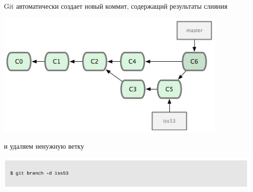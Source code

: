 \documentclass{beamer}
\begin{document}
\begin{frame}
\begin{block}{Git автоматически создает новый коммит, содержащий результаты слияния}
\begin{center}
\includegraphics[scale=0.5]{images/ex-18.png}
\end{center}
\end{block}
\begin{block}{и удаляем ненужную ветку}
\begin{center}
\includegraphics[scale=0.5]{images/ex-19.png}
\end{center}
\end{block}
\end{frame}
\end{document}
